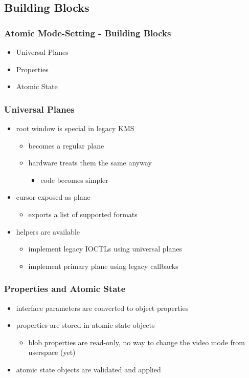 \documentclass[t]{beamer}
\begin{document}
\subsection{Building Blocks}

\begin{frame}
	\frametitle{Atomic Mode-Setting - Building Blocks}
	\begin{itemize}
		\item Universal Planes
		\item Properties
		\item Atomic State
	\end{itemize}
\end{frame}

\begin{frame}
	\frametitle{Universal Planes}
	\begin{itemize}
		\item root window is special in legacy KMS
			\begin{itemize}
				\item becomes a regular plane
				\item hardware treats them the same anyway
					\begin{itemize}
						\item code becomes simpler
					\end{itemize}
			\end{itemize}
		\item cursor exposed as plane
			\begin{itemize}
				\item exports a list of supported formats
			\end{itemize}
		\item helpers are available
			\begin{itemize}
				\item implement legacy IOCTLs using universal planes
				\item implement primary plane using legacy callbacks
			\end{itemize}
	\end{itemize}
\end{frame}

\begin{frame}
	\frametitle{Properties and Atomic State}
	\begin{itemize}
		\item interface parameters are converted to object properties
		\item properties are stored in atomic state objects
			\begin{itemize}
				\item blob properties are read-only, no way to change the
					video mode from userspace (yet)
			\end{itemize}
		\item atomic state objects are validated and applied
	\end{itemize}
\end{frame}
\end{document}
